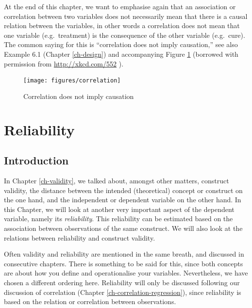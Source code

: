 \documentclass[
]{book}
\begin{document}
At the end of this chapter, we want to emphasise again that an association or correlation
between two variables does not necessarily mean
that there is a causal relation between the variables, in other words
a correlation does not mean that one variable (e.g.~treatment) is the consequence of
the other variable (e.g.~cure).
The common saying for this is ``correlation does not imply
causation,'' see also Example 6.1 (Chapter \ref{ch-design})
and accompanying Figure \ref{fig:xkcd552} (borrowed with permission from \url{http://xkcd.com/552} ).

\begin{figure}

{\centering \texttt{[image: figures/correlation]} 

}

\caption{Correlation does not imply causation}\label{fig:xkcd552}
\end{figure}

\hypertarget{ch-reliability}{%
\chapter{Reliability}\label{ch-reliability}}

\hypertarget{introduction-6}{%
\section{Introduction}\label{introduction-6}}

In Chapter \ref{ch-validity}, we talked about, amongst other matters,
construct validity, the distance between the intended (theoretical)
concept or construct on the one hand, and the independent or dependent variable
on the other hand. In this Chapter, we will look at another very important
aspect of the dependent variable, namely its \emph{reliability}.
This reliability can be estimated based on the
association between observations of the same construct.
We will also look at the relations between reliability and construct validity.

Often validity and reliability are mentioned in the same breath, and discussed in consecutive
chapters. There is something to be said for this, since both concepts are about how you define and
operationalise your variables. Nevertheless, we have chosen a different ordering here. Reliability
will only be discussed following our discussion of correlation (Chapter
\ref{ch-correlation-regression}), since reliability is based on the relation or correlation
between observations.
\end{document}
